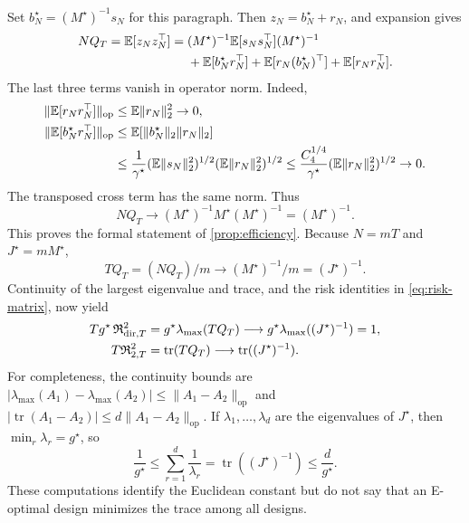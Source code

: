 \documentclass[10pt,twoside,letterpaper]{article}
\newcommand{\E}{\mathbb E}
\newcommand{\tr}{\operatorname{tr}}
\newcommand{\op}{\mathrm{op}}
\newcommand{\norm}[1]{\lVert #1\rVert}
\newcommand{\gstar}{g^\star}
\newcommand{\Rdir}{\mathfrak R_{\mathrm{dir},T}}
\newcommand{\Rtwo}{\mathfrak R_{2,T}}
\begin{document}
Set $b_N^\star=(M^\star)^{-1}s_N$ for this paragraph.
Then $z_N=b_N^\star+r_N$, and expansion gives
\begin{align}
NQ_T
=\E[z_Nz_N^\top]
={}&(M^\star)^{-1}\E[s_Ns_N^\top](M^\star)^{-1}\notag\\
&+\E[b_N^\star r_N^\top]
+\E[r_N(b_N^\star)^\top]+\E[r_Nr_N^\top].
\label{eq:app-mse-expansion}
\end{align}
The last three terms vanish in operator norm. Indeed,
\begin{align}
\norm{\E[r_Nr_N^\top]}_{\op}
&\le\E\norm{r_N}_2^2\to0,\notag\\
\norm{\E[b_N^\star r_N^\top]}_{\op}
&\le\E[\norm{b_N^\star}_2\norm{r_N}_2]\notag\\
&\le\frac1{\gamma^\star}
(\E\norm{s_N}_2^2)^{1/2}(\E\norm{r_N}_2^2)^{1/2}
\le\frac{C_4^{1/4}}{\gamma^\star}
(\E\norm{r_N}_2^2)^{1/2}\to0.
\label{eq:app-mse-cross-terms}
\end{align}
The transposed cross term has the same norm. Thus
\begin{equation}
NQ_T\longrightarrow(M^\star)^{-1}M^\star(M^\star)^{-1}
=(M^\star)^{-1}.
\label{eq:app-mse-limit}
\end{equation}
This proves the formal statement of \cref{prop:efficiency}.
Because $N=mT$ and $J^\star=mM^\star$,
\begin{equation}
TQ_T=(NQ_T)/m\longrightarrow (M^\star)^{-1}/m=(J^\star)^{-1}.
\label{eq:app-per-round-mse}
\end{equation}
Continuity of the largest eigenvalue and trace, and the risk identities
in \eqref{eq:risk-matrix}, now yield
\begin{align}
T\gstar\,\Rdir^2
&=\gstar\lambda_{\max}(TQ_T)
\longrightarrow\gstar\lambda_{\max}((J^\star)^{-1})=1,\notag\\
T\Rtwo^2
&=\tr(TQ_T)\longrightarrow\tr((J^\star)^{-1}).
\label{eq:app-risk-constant-calculation}
\end{align}
For completeness, the continuity bounds are
$|\lambda_{\max}(A_1)-\lambda_{\max}(A_2)|
\le\norm{A_1-A_2}_{\op}$ and
$|\tr(A_1-A_2)|\le d\norm{A_1-A_2}_{\op}$.
If $\lambda_1,\ldots,\lambda_d$ are the eigenvalues of $J^\star$,
then $\min_r\lambda_r=\gstar$, so
\begin{equation}
\frac1{\gstar}\le\sum_{r=1}^d\frac1{\lambda_r}
=\tr((J^\star)^{-1})\le\frac d{\gstar}.
\label{eq:app-trace-risk-range}
\end{equation}
These computations identify the Euclidean constant but do not say
that an E-optimal design minimizes the trace among all designs.
\end{document}
